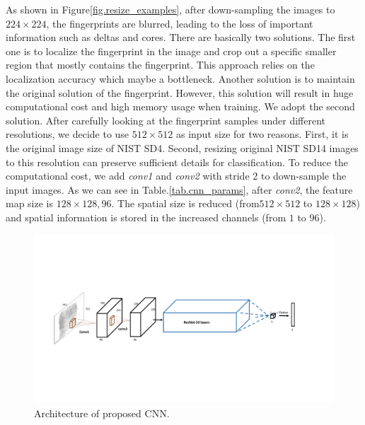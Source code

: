 As shown in Figure\ref{fig.resize_examples}, after down-sampling the images to $224\times224$, the fingerprints are blurred, leading to the loss of important information such as deltas and cores.
%
There are basically two solutions. The first one is to localize the fingerprint in the image and crop out a specific smaller region that mostly contains the fingerprint. This approach relies on the localization accuracy which maybe a bottleneck.
%
Another solution is to maintain the original solution of the fingerprint. However, this solution will result in huge computational cost and high memory usage when training.
%
We adopt the second solution. After carefully looking at the fingerprint samples under different resolutions, we decide to use $512\times512$ as input size for two reasons. First, it is the original image size of NIST SD4. Second, resizing original NIST SD14 images to this resolution can preserve sufficient details for classification.
%
To reduce the computational cost, we add \textit{conv1} and \textit{conv2} with stride 2 to down-sample the input images. As we can see in Table.\ref{tab.cnn_params}, after \textit{conv2}, the feature map size is $128\times128, 96$. The spatial size is reduced (from$512 \times 512$ to $128 \times 128$) and spatial information is stored in the increased channels (from $1$ to $96$).

\begin{figure}[!ht]
	\begin{center}
		\includegraphics[scale=0.65,clip=true,trim = 20mm 65mm 30mm 65mm]{fig/figs/cnn_arch.pdf}
	\end{center}
	\caption{Architecture of proposed CNN.} 
	\label{fig.cnn_arch}
\end{figure}


